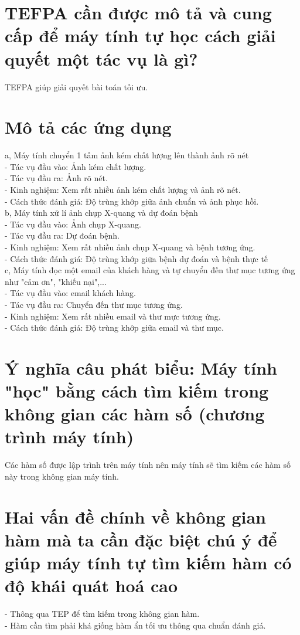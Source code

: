 \documentclass{article}
\begin{document}
\section{TEFPA cần được mô tả và cung cấp để máy tính tự học cách giải quyết một tác vụ là gì?}
TEFPA giúp giải quyết bài toán tối ưu.

\section{Mô tả các ứng dụng}
a, Máy tính chuyển 1 tấm ảnh kém chất lượng lên thành ảnh rõ nét\\[0.2cm]
- Tác vụ đầu vào: Ảnh kém chất lượng.\\[0.1cm]
- Tác vụ đầu ra: Ảnh rõ nét.\\[0.2cm]
- Kinh nghiệm: Xem rất nhiều ảnh kém chất lượng và ảnh rõ nét.\\[0.2cm]
- Cách thức đánh giá: Độ trùng khớp giữa ảnh chuẩn và ảnh phục hồi.
\\[0.3cm]
 b, Máy tính xử lí ảnh chụp X-quang và dự đoán bệnh\\[0.2cm]
 - Tác vụ đầu vào: Ảnh chụp X-quang.\\[0.1cm]
 - Tác vụ đầu ra: Dự đoán bệnh.\\[0.2cm]
 - Kinh nghiệm: Xem rất nhiều ảnh chụp X-quang và bệnh tương ứng.\\[0.2cm]
 - Cách thức đánh giá: Độ trùng khớp giữa bệnh dự đoán và bệnh thực tế
 \\[0.3cm]
 c, Máy tính đọc một email của khách hàng và tự chuyển đến thư mục tương ứng như "cảm ơn", "khiếu nại",...\\[0.2cm]
 - Tác vụ đầu vào: email khách hàng.\\[0.1cm]
 - Tác vụ đầu ra: Chuyển đến thư mục tương ứng.\\[0.2cm]
 - Kinh nghiệm: Xem rất nhiều email và thư mực tương ứng.\\[0.2cm]
 - Cách thức đánh giá: Độ trùng khớp giữa email và thư mục.
\section {Ý nghĩa câu phát biểu: Máy tính "học" bằng cách tìm kiếm trong không gian các hàm số (chương trình máy tính)}
Các hàm số được lập trình trên máy tính nên máy tính sẽ tìm kiếm các hàm số này trong không gian máy tính.

\section{Hai vấn đề chính về không gian hàm mà ta cần đặc biệt chú ý để giúp máy tính tự tìm kiếm hàm có độ khái quát hoá cao}
- Thông qua TEP để tìm kiếm trong không gian hàm.\\[0.2cm]
- Hàm cần tìm phải khá giống hàm ẩn tối ưu thông qua chuẩn đánh giá.
\end{document}
